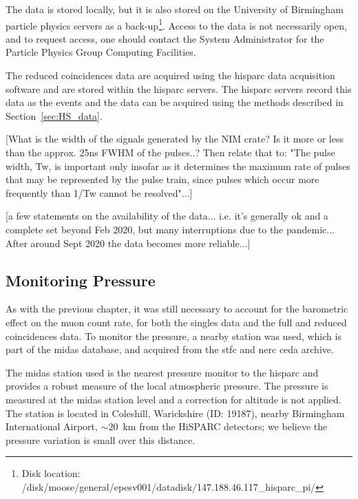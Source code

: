 The data is stored locally, but it is also stored on the University of Birmingham particle physics servers as a back-up\footnote{Disk location: /disk/moose/general/epesv001/datadisk/147.188.46.117\_hisparc\_pi/}. Access to the data is not necessarily open, and to request access, one should contact the System Administrator for the Particle Physics Group Computing Facilities.

The reduced coincidences data are acquired using the \gls{hisparc} data acquisition software and are stored within the \gls{hisparc} servers. The \gls{hisparc} servers record this data as the events and the data can be acquired using the methods described in Section~\ref{sec:HS_data}.




[What is the width of the signals generated by the NIM crate? Is it more or less than the approx. 25ns FWHM of the pulses..? Then relate that to: "The pulse width, Tw, is important only insofar as it determines the maximum rate of pulses that may be represented by the pulse train, since pulses which occur more frequently than 1/Tw cannot be resolved"...]



[a few statements on the availability of the data... i.e. it's generally ok and a complete set beyond Feb 2020, but many interruptions due to the pandemic... After around Sept 2020 the data becomes more reliable...]



\subsection{Monitoring Pressure}

As with the previous chapter, it was still necessary to account for the barometric effect on the muon count rate, for both the singles data and the full and reduced coincidences data. To monitor the pressure, a nearby station was used, which is part of the \gls{midas} database, and acquired from the \gls{stfc} and \gls{nerc} \gls{ceda} archive.

The \gls{midas} station used is the nearest pressure monitor to the \gls{hisparc} and provides a robust measure of the local atmospheric pressure. The pressure is measured at the \gls{midas} station level and a correction for altitude is not applied. The station is located in Coleshill, Warickshire (ID: 19187), nearby Birmingham International Airport, $\sim 20$~km from the HiSPARC detectors; we believe the pressure variation is small over this distance.

